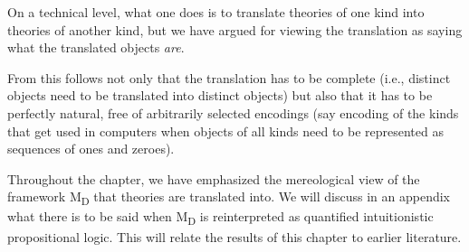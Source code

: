 \documentclass[12pt]{book}
\begin{document}
On a technical level, what one does is to translate theories of one kind into theories of another kind, but we have argued for viewing the translation as saying what the translated objects \textit{are}.

From this follows not only that the translation has to be complete (i.e., distinct objects need to be translated into distinct objects) but also that it has to be perfectly natural, free of arbitrarily selected encodings (say encoding of the kinds that get used in computers when objects of all kinds need to be represented as sequences of ones and zeroes).

Throughout the chapter, we have emphasized the mereological view of the framework M\textsubscript{D} that theories are translated into. We will discuss in an appendix what there is to be said when M\textsubscript{D} is reinterpreted as quantified intuitionistic propositional logic. This will relate the results of this chapter to earlier literature.
\end{document}
